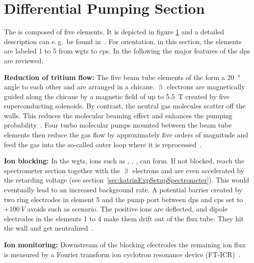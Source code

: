 \section{Differential Pumping Section}
\label{sec:katrinExpSetupDiffPumpingSection}
\begin{figure}[t]
 \label{fig:katrinExpSetupDiffPumpingSection}
\end{figure}
The  is composed of five elements. It is depicted in figure \ref{fig:katrinExpSetupDiffPumpingSection} and a detailed description can e.\,g.~be found in~\cite{Kosmider2012}. For orientation, in this section, the elements are labeled 1 to 5 from \gls{wgts} to \gls{cps}. In the following the major features of the \gls{dps} are reviewed:

{\par\textbf{Reduction of tritium flow:}
The five beam tube elements of the  form a \SI{20}{\degree} angle to each other and are arranged in a chicane. $\upbeta$ electrons are magnetically guided along the chicane by a magnetic field of up to \SI{5.5}{T} created by five superconducting solenoids. By contrast, the neutral gas molecules scatter off the walls. This reduces the molecular beaming effect and enhances the pumping probability~\cite{ZHANG2012}. Four turbo molecular pumps mounted between the beam tube elements then reduce the gas flow by approximately five orders of magnitude and feed the gas into the so-called outer loop where it is reprocessed~\cite{Kosmider2012}.}

{\par\textbf{Ion blocking:}
In the \gls{wgts}, ions such as , , ,  can form. If not blocked, reach the spectrometer section together with the $\upbeta$ electrons and are even accelerated by the retarding voltage (see section~\ref{sec:katrinExpSetupSpectrometer}). This would eventually lead to an increased background rate. A potential barrier created by two ring electrodes in element 5 and the pump port between \gls{dps} and \gls{cps} set to $+\SI{100}{V}$ avoids such as scenario. The positive ions are deflected, and dipole electrodes in the elements 1 to 4 make them drift out of the flux tube. They hit the wall and get neutralized~\cite{Klein2019}.}

{\par\textbf{Ion monitoring:}
Downstream of the blocking electrodes the remaining ion flux is measured by a Fourier transform ion cyclotron resonance device (FT-ICR)~\cite{Ubieto2009}.}
